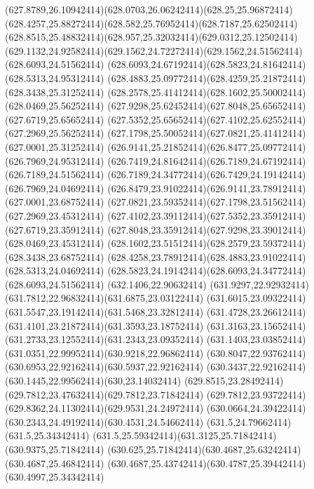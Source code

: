 {{	\curveto(627.8789,26.10942414)(628.0703,26.06242414)(628.25,25.96872414)
	\curveto(628.4257,25.88272414)(628.582,25.76952414)(628.7187,25.62502414)
	\curveto(628.8515,25.48832414)(628.957,25.32032414)(629.0312,25.12502414)
	\curveto(629.1132,24.92582414)(629.1562,24.72272414)(629.1562,24.51562414)
	\closepath
	\moveto(628.6093,24.51562414)
	\curveto(628.6093,24.67192414)(628.5823,24.81642414)(628.5313,24.95312414)
	\curveto(628.4883,25.09772414)(628.4259,25.21872414)(628.3438,25.31252414)
	\curveto(628.2578,25.41412414)(628.1602,25.50002414)(628.0469,25.56252414)
	\curveto(627.9298,25.62452414)(627.8048,25.65652414)(627.6719,25.65652414)
	\curveto(627.5352,25.65652414)(627.4102,25.62552414)(627.2969,25.56252414)
	\curveto(627.1798,25.50052414)(627.0821,25.41412414)(627.0001,25.31252414)
	\curveto(626.9141,25.21852414)(626.8477,25.09772414)(626.7969,24.95312414)
	\curveto(626.7419,24.81642414)(626.7189,24.67192414)(626.7189,24.51562414)
	\curveto(626.7189,24.34772414)(626.7429,24.19142414)(626.7969,24.04692414)
	\curveto(626.8479,23.91022414)(626.9141,23.78912414)(627.0001,23.68752414)
	\curveto(627.0821,23.59352414)(627.1798,23.51562414)(627.2969,23.45312414)
	\curveto(627.4102,23.39112414)(627.5352,23.35912414)(627.6719,23.35912414)
	\curveto(627.8048,23.35912414)(627.9298,23.39012414)(628.0469,23.45312414)
	\curveto(628.1602,23.51512414)(628.2579,23.59372414)(628.3438,23.68752414)
	\curveto(628.4258,23.78912414)(628.4883,23.91022414)(628.5313,24.04692414)
	\curveto(628.5823,24.19142414)(628.6093,24.34772414)(628.6093,24.51562414)
	\closepath
	\moveto(632.1406,22.90632414)
	\curveto(631.9297,22.92932414)(631.7812,22.96832414)(631.6875,23.03122414)
	\curveto(631.6015,23.09322414)(631.5547,23.19142414)(631.5468,23.32812414)
	\curveto(631.4728,23.26612414)(631.4101,23.21872414)(631.3593,23.18752414)
	\curveto(631.3163,23.15652414)(631.2733,23.12552414)(631.2343,23.09352414)
	\curveto(631.1403,23.03852414)(631.0351,22.99952414)(630.9218,22.96862414)
	\curveto(630.8047,22.93762414)(630.6953,22.92162414)(630.5937,22.92162414)
	\curveto(630.3437,22.92162414)(630.1445,22.99562414)(630,23.14032414)
	\curveto(629.8515,23.28492414)(629.7812,23.47632414)(629.7812,23.71842414)
	\curveto(629.7812,23.93722414)(629.8362,24.11302414)(629.9531,24.24972414)
	\curveto(630.0664,24.39422414)(630.2343,24.49192414)(630.4531,24.54662414)
	\lineto(631.5,24.79662414)
	\lineto(631.5,25.34342414)
	\curveto(631.5,25.59342414)(631.3125,25.71842414)(630.9375,25.71842414)
	\curveto(630.625,25.71842414)(630.4687,25.63242414)(630.4687,25.46842414)
	\curveto(630.4687,25.43742414)(630.4787,25.39442414)(630.4997,25.34342414)
}}
